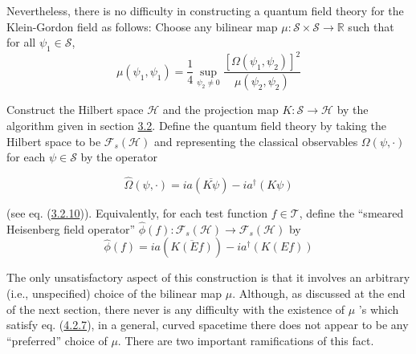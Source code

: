 \documentclass[11pt,a4paper]{article}
\begin{document}
Nevertheless, there is no difficulty in constructing a quantum field theory for the Klein-Gordon field as follows: Choose any bilinear map \(\mu: \mathcal{S} \times \mathcal{S} \to \mathbb{R}\) such that for all \(\psi_1 \in \mathcal{S}\),
\begin{equation*}
\mu(\psi_1, \psi_1) = \frac{1}{4} \sup_{\psi_2 \neq 0} \frac{[\Omega(\psi_1, \psi_2)]^2}{\mu(\psi_2, \psi_2)} \tag{4.2.7}\label{eq:4.2.7}
\end{equation*}

Construct the Hilbert space \(\mathcal{H}\) and the projection map \(K: \mathcal{S}\to\mathcal{H}\) by the algorithm given in section \hyperlink{sec:3.2}{3.2}. Define the quantum field theory by taking the Hilbert space to be \(\mathcal{F}_s(\mathcal{H})\) and representing the classical observables \(\Omega(\psi, \cdot)\) for each \(\psi \in \mathcal{S}\) by the operator

\hypertarget{source-72}{}
\begin{equation*}
\widehat{\Omega}(\psi,\cdot) = ia(\overline{K\psi}) - ia^{\dagger}(K\psi) \tag{4.2.8}\label{eq:4.2.8}
\end{equation*}

(see eq. (\hyperref[eq:3.2.10]{3.2.10})). Equivalently, for each test function \(f \in \mathcal{T}\), define the ``smeared Heisenberg field operator'' \(\hat{\phi}(f) : \mathcal{F}_s(\mathcal{H}) \to \mathcal{F}_s(\mathcal{H})\) by
\begin{equation*}
\widehat{\phi}(f) = ia(\overline{K(Ef)}) - ia^{\dagger}(K(Ef)) \tag{4.2.9}\label{eq:4.2.9}
\end{equation*}

The only unsatisfactory aspect of this construction is that it involves an arbitrary (i.e., unspecified) choice of the bilinear map \(\mu.\) Although, as discussed at the end of the next section, there never is any difficulty with the existence of \(\mu\) 's which satisfy eq. (\hyperref[eq:4.2.7]{4.2.7}), in a general, curved spacetime there does not appear to be any ``preferred'' choice of \(\mu.\) There are two important ramifications of this fact.
\end{document}
